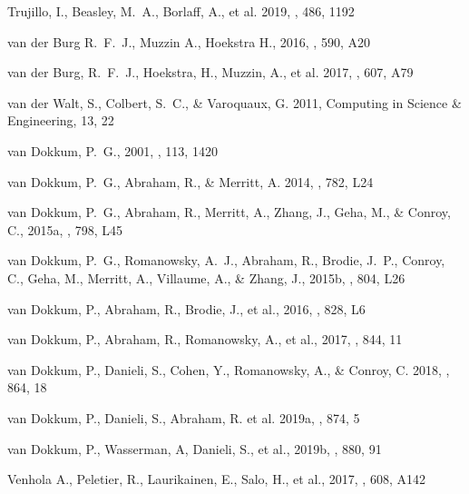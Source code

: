 \documentclass[twocolumn,tighten]{aastex63}
\begin{document}
\begin{thebibliography}{}

Trujillo, I., Beasley, M.~A., Borlaff, A., et al. 2019, \mnras, 486, 1192

van der Burg R.~F.~J., Muzzin A., Hoekstra H., 2016, \aap, 590, A20

van der Burg, R.~F.~J., Hoekstra, H., Muzzin, A., et al. 2017, \aap, 607, A79

{van der Walt}, S., Colbert, S.~C., \& Varoquaux, G. 2011, Computing in Science \& Engineering, 13, 22

{van Dokkum}, P.~G., 2001, \pasp, 113, 1420

{van Dokkum}, P.~G., Abraham, R., \& Merritt, A. 2014, \apjl, 782, L24

{van Dokkum}, P.~G., {Abraham}, R., {Merritt}, A., {Zhang}, J., {Geha}, M., \& {Conroy}, C., 2015a, \apjl, 798, L45

{van Dokkum}, P.~G., {Romanowsky}, A.~J., {Abraham}, R., {Brodie}, J.~P., {Conroy}, C., {Geha}, M., {Merritt}, A., {Villaume}, A., \& {Zhang}, J., 2015b, \apjl, 804, L26

{van Dokkum}, P., {Abraham}, R., {Brodie}, J., et al., 2016, \apjl, 828, L6

{van Dokkum}, P., Abraham, R., Romanowsky, A., et al., 2017, \apjl, 844, 11

van Dokkum, P., Danieli, S.,  Cohen, Y., Romanowsky, A., \& Conroy, C. 2018, \apjl, 864, 18

{van Dokkum}, P., Danieli, S., Abraham, R. et al. 2019a, \apjl, 874, 5

{van Dokkum}, P., Wasserman, A, Danieli, S., et al., 2019b, \apj, 880, 91

Venhola A., Peletier, R., Laurikainen, E., Salo, H., et al., 2017, \aap, 608, A142


\end{thebibliography}
\end{document}
